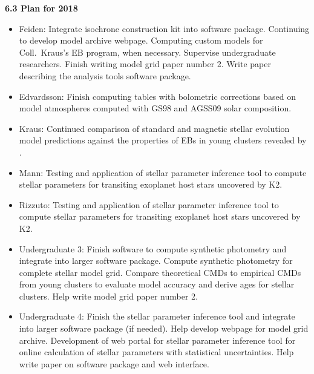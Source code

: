 {\bf 6.3 Plan for 2018} 

\begin{itemize}
	\item[] Feiden: Integrate isochrone construction kit into software package. Continuing to develop model archive webpage. Computing custom models for Coll.\ Kraus's EB program, when necessary. Supervise undergraduate researchers. Finish writing model grid paper number 2. Write paper describing the analysis tools software package. \\
	
	\item[] Edvardsson: Finish computing tables with bolometric corrections based on model atmospheres computed with GS98 and AGSS09 solar composition.  \\
	
	\item[] Kraus: Continued comparison of standard and magnetic stellar evolution model predictions against the properties of EBs in young clusters revealed by \kepler. \\
	
	\item[] Mann: Testing and application of stellar parameter inference tool to compute stellar parameters for transiting exoplanet host stars uncovered by K2. \\
	
	\item[] Rizzuto: Testing and application of stellar parameter inference tool to compute stellar parameters for transiting exoplanet host stars uncovered by K2. \\

	\item[] Undergraduate 3: Finish software to compute synthetic photometry and integrate into larger software package. Compute synthetic photometry for complete stellar model grid. Compare theoretical CMDs to empirical CMDs from young clusters to evaluate model accuracy and derive ages for stellar clusters. Help write model grid paper number 2. \\
	
	\item[] Undergraduate 4: Finish the stellar parameter inference tool and integrate into larger software package (if needed). Help develop webpage for model grid archive. Development of web portal for stellar parameter inference tool for online calculation of stellar parameters with statistical uncertainties. Help write paper on software package and web interface.
\end{itemize} 
